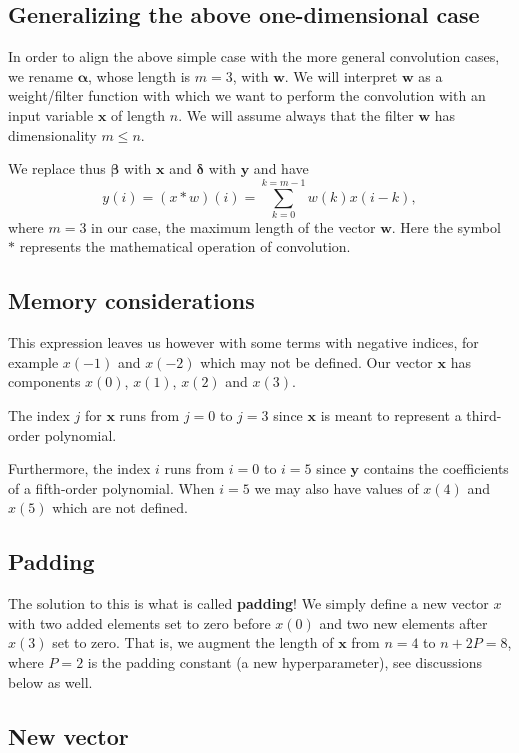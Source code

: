 \documentclass[%
oneside,                 %
final,                   %
10pt]{article}
\begin{document}
\noindent
\subsection{Generalizing the above one-dimensional case}

In order to align the above simple case with the more general
convolution cases, we rename $\bm{\alpha}$, whose length is $m=3$,
with $\bm{w}$.  We will interpret $\bm{w}$ as a weight/filter function
with which we want to perform the convolution with an input variable
$\bm{x}$ of length $n$.  We will assume always that the filter
$\bm{w}$ has dimensionality $m \le n$.

We replace thus $\bm{\beta}$ with $\bm{x}$ and $\bm{\delta}$ with $\bm{y}$ and have
\[
y(i)= \left(x*w\right)(i)= \sum_{k=0}^{k=m-1}w(k)x(i-k),
\]
where $m=3$ in our case, the maximum length of the vector $\bm{w}$.
Here the symbol $*$ represents the mathematical operation of convolution.

\subsection{Memory considerations}

This expression leaves us however with some terms with negative
indices, for example $x(-1)$ and $x(-2)$ which may not be defined. Our
vector $\bm{x}$ has components $x(0)$, $x(1)$, $x(2)$ and $x(3)$.

The index $j$ for $\bm{x}$ runs from $j=0$ to $j=3$ since $\bm{x}$ is meant to
represent a third-order polynomial.

Furthermore, the index $i$ runs from $i=0$ to $i=5$ since $\bm{y}$
contains the coefficients of a fifth-order polynomial.  When $i=5$ we
may also have values of $x(4)$ and $x(5)$ which are not defined.

\subsection{Padding}

The solution to this is what is called \textbf{padding}!  We simply define a
new vector $x$ with two added elements set to zero before $x(0)$ and
two new elements after $x(3)$ set to zero. That is, we augment the
length of $\bm{x}$ from $n=4$ to $n+2P=8$, where $P=2$ is the padding
constant (a new hyperparameter), see discussions below as well.

\subsection{New vector}
\end{document}
